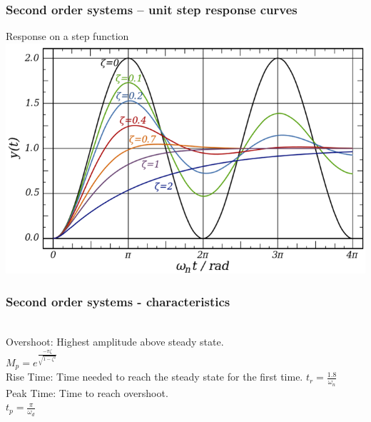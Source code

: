\begin{frame}
\frametitle{Second order systems – unit step response curves}
 Response on a step function
\\ \vspace{1cm} \includegraphics[width=0.8\linewidth]{Afbeelding6}
\end{frame}

\begin{frame}
\frametitle{Second order systems - characteristics}
\\ Overshoot: Highest amplitude above steady state.
\\ $M_p = e^{\frac{-\pi\zeta}{\sqrt{1-\zeta^2}}}$
\vspace{0.12cm}
\pause
\\ Rise Time: Time needed to reach the steady state for the first time. $t_r = \frac{1.8}{\omega_n}$
\vspace{0.12cm}
\pause
\\ Peak Time: Time to reach overshoot.\\$t_p =\frac{\pi}{\omega_d}$
\vspace{-0.2cm}
\\ 
\begin{figure}
\end{figure}
\end{frame}

